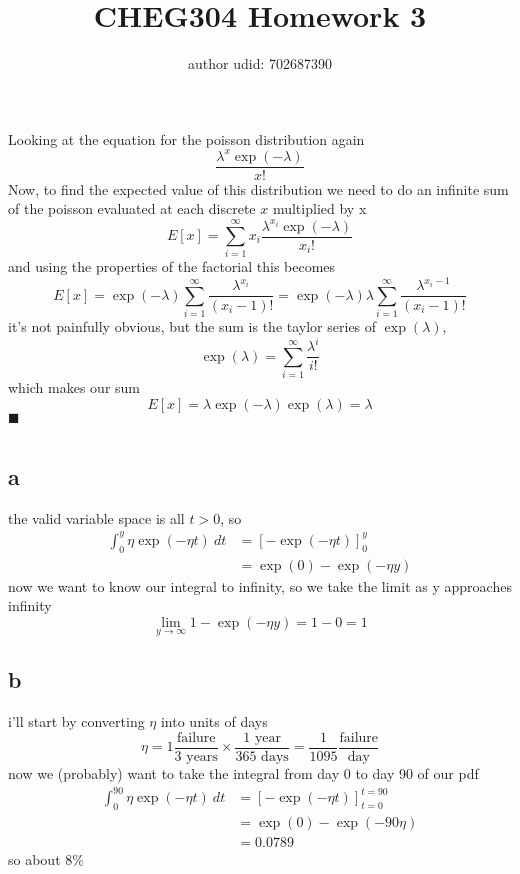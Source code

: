 \documentclass{article}
\title{\bfseries CHEG304 Homework 3}
\author{author udid: 702687390}
\date{}
\begin{document}
\maketitle

\section{}

Looking at the equation for the poisson distribution again
\[ \frac{\lambda^x \exp(-\lambda)}{x!} \tag{poisson distribution}\]
Now, to find the expected value of this distribution we need to do an infinite sum of the poisson evaluated at each discrete $x$ multiplied by x
\[ E[x] = \sum_{i=1}^{\infty} x_i \frac{\lambda^{x_i} \exp(-\lambda)}{x_i!} \]
and using the properties of the factorial this becomes 
\[ E[x] = \exp(-\lambda) \sum_{i=1}^{\infty}  \frac{\lambda^{x_i} }{(x_i-1)!} = \exp(-\lambda) \lambda \sum_{i=1}^{\infty}  \frac{\lambda^{x_i - 1} }{(x_i-1)!} \]
it's not painfully obvious, but the sum is the taylor series of $\exp(\lambda)$,
\[ \exp(\lambda) = \sum_{i=1}^{\infty} \frac{\lambda^i}{i!} \tag{taylor series of $e^\lambda$}\]
which makes our sum
\[ E[x] = \lambda \exp(-\lambda) \exp(\lambda) = \lambda \]
\hfill
$ \blacksquare $

\vspace{2em}
\noindent\makebox[\linewidth]{\rule{\textwidth}{0.4pt}}
\vspace{2em}

\section{}
\subsection*{a}
the valid variable space is all $t>0$, so
\begin{align*}
    \int_{0}^{y} \eta \exp(-\eta t) \ dt &= \left[ -\exp(-\eta t) \right]_{0}^{y} \\
    &= \exp(0) - \exp(-\eta y)
\end{align*}
now we want to know our integral to infinity, so we take the limit as y approaches infinity
\[ \lim_{y \rightarrow \infty} 1 - \exp(-\eta y) = 1 - 0 = 1 \]

\subsection*{b}
i'll start by converting $\eta$ into units of days
\[ \eta = 1 \frac{\text{failure}}{3 \text{ years}} \times \frac{1 \text{ year}}{365 \text{ days}} = \frac{1}{1095} \frac{\text{failure}}{\text{day}} \]
now we (probably) want to take the integral from day 0 to day 90 of our pdf
\begin{align*}
    \int_{0}^{90} \eta \exp(-\eta t) \ dt &= \left[ -\exp(-\eta t) \right]_{t=0}^{t=90}\\
    &= \exp(0) - \exp(-90\eta) \\
    &= \boxed{0.0789}
\end{align*}
so about 8\%
\end{document}
